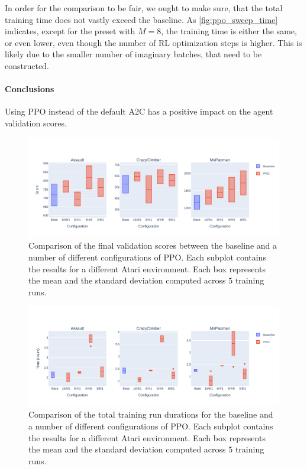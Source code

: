 \documentclass[en]{pracamgr}
\newcommand{\figurewidth}{\linewidth}
\newcommand{\figureheight}{0.8\paperheight}
\begin{document}
In order for the comparison to be fair, we ought to make sure, that the total training time does not vastly exceed the baseline. As \autoref{fig:ppo_sweep_time} indicates, except for the preset with $M = 8$, the training time is either the same, or even lower, even though the number of RL optimization steps is higher. This is likely due to the smaller number of imaginary batches, that need to be constructed.

\paragraph{Conclusions} Using PPO instead of the default A2C has a positive impact on the agent validation scores.

\begin{figure}
  \centering
  \includegraphics[width=\figurewidth,height=\figureheight,keepaspectratio]{assets/ppo.sweep.pdf}
  \caption{Comparison of the final validation scores between the baseline and a number of different configurations of PPO. Each subplot contains the results for a different Atari environment. Each box represents the mean and the standard deviation computed across $5$ training runs.}
  \label{fig:ppo_sweep}
\end{figure}

\begin{figure}
  \centering
  \includegraphics[width=\figurewidth,height=\figureheight,keepaspectratio]{assets/ppo_sweep.time.pdf}
  \caption{Comparison of the total training run durations for the baseline and a number of different configurations of PPO. Each subplot contains the results for a different Atari environment. Each box represents the mean and the standard deviation computed across $5$ training runs.}
  \label{fig:ppo_sweep_time}
\end{figure}
\end{document}

